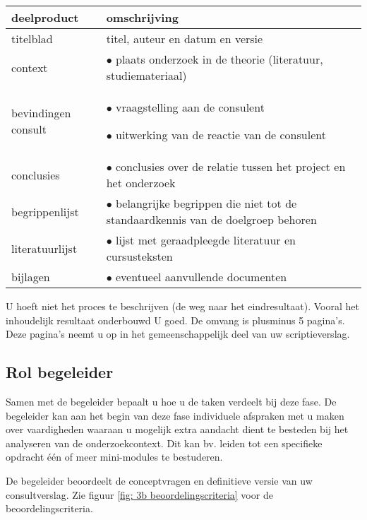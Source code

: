 \begin{center}
\begin{tabular}{|p{7em}|p{23em}|}
\hline
{\bf deelproduct} & {\bf omschrijving}
\\\hline
titelblad & titel, auteur en datum en versie
\\\hline
context &
    \par $\bullet$ plaats onderzoek in de theorie (literatuur, studiemateriaal)
\\\hline
bevindingen consult &
    \par $\bullet$ vraagstelling aan de consulent
    \par $\bullet$ uitwerking van de reactie van de consulent
\\\hline
conclusies &
    \par $\bullet$ conclusies over de relatie tussen het project en het onderzoek
\\\hline
begrippenlijst &
    \par $\bullet$ belangrijke begrippen die niet tot de standaardkennis van de doelgroep
		    behoren
\\\hline
literatuurlijst &
    \par $\bullet$ lijst met geraadpleegde literatuur en cursusteksten
\\\hline
bijlagen &
    \par $\bullet$ eventueel aanvullende documenten
\\\hline
\end{tabular}
\end{center}

U hoeft niet het proces te beschrijven (de weg naar het eindresultaat).
Vooral het inhoudelijk resultaat onderbouwd U goed. De omvang is plusminus  5 pagina's.
Deze pagina's neemt u op in het gemeenschappelijk deel van uw scriptieverslag.

\subsection{Rol begeleider}
Samen met de begeleider bepaalt u hoe u de taken verdeelt bij deze fase.
De begeleider kan aan het begin van deze fase individuele afspraken met u
maken over vaardigheden waaraan u mogelijk extra aandacht dient te besteden bij
het analyseren van de onderzoekcontext. Dit kan bv. leiden tot een specifieke
opdracht één of meer mini-modules te bestuderen.

De begeleider beoordeelt de conceptvragen en definitieve versie van uw
consultverslag. Zie figuur \ref{fig: 3b beoordelingscriteria} voor de beoordelingscriteria.

